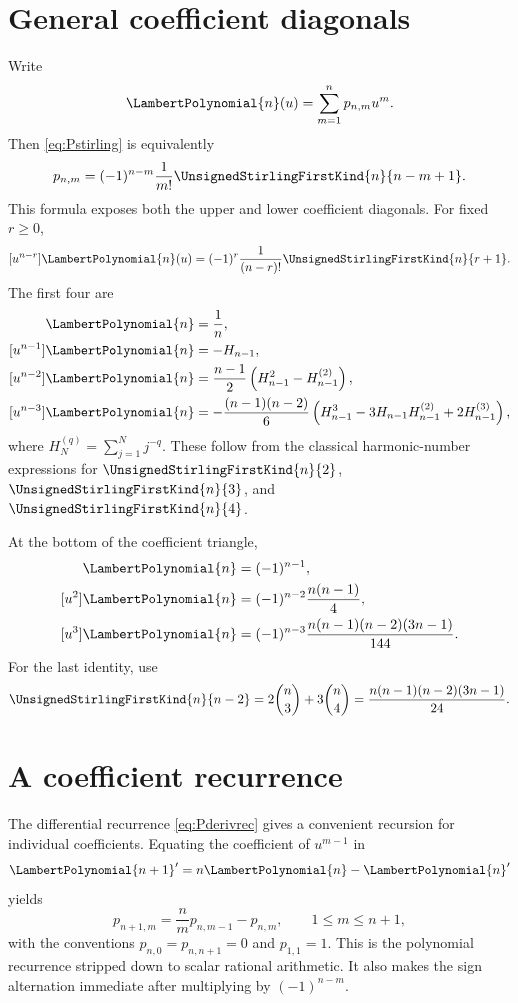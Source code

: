 \documentclass[11pt,oneside,openany]{book}
\begin{document}
\section{General coefficient diagonals}
Write
\[
 \LambertPolynomial{n}(u)=\sum_{m=1}^np_{n,m}u^m.
\]
Then \cref{eq:Pstirling} is equivalently
\begin{equation}\label{eq:pnmappendix}
 p_{n,m}=(-1)^{n-m}\frac{1}{m!}
 \UnsignedStirlingFirstKind{n}{n-m+1}.
\end{equation}
This formula exposes both the upper and lower coefficient diagonals.
For fixed \(r\geq0\),
\begin{equation}\label{eq:upperdiagonal}
 [u^{n-r}]\LambertPolynomial{n}(u)
 =(-1)^r\frac{1}{(n-r)!}\UnsignedStirlingFirstKind{n}{r+1}.
\end{equation}
The first four are
\begin{align}
 [u^n]\LambertPolynomial{n}&=\frac1n,
 \label{eq:diagtop0}\\
 [u^{n-1}]\LambertPolynomial{n}&=-H_{n-1},
 \label{eq:diagtop1}\\
 [u^{n-2}]\LambertPolynomial{n}
 &=\frac{n-1}{2}\left(H_{n-1}^2-H_{n-1}^{(2)}\right),
 \label{eq:diagtop2}\\
 [u^{n-3}]\LambertPolynomial{n}
 &=-\frac{(n-1)(n-2)}{6}
 \left(H_{n-1}^3-3H_{n-1}H_{n-1}^{(2)}
       +2H_{n-1}^{(3)}\right),
 \label{eq:diagtop3}
\end{align}
where
\(H_N^{(q)}=\sum_{j=1}^Nj^{-q}\).
These follow from the classical harmonic-number expressions for
\(\UnsignedStirlingFirstKind{n}{2}\), \(\UnsignedStirlingFirstKind{n}{3}\), and
\(\UnsignedStirlingFirstKind{n}{4}\).

At the bottom of the coefficient triangle,
\begin{align}
 [u]\LambertPolynomial{n}&=(-1)^{n-1},
 \label{eq:diagbottom1}\\
 [u^2]\LambertPolynomial{n}&=(-1)^{n-2}\frac{n(n-1)}4,
 \label{eq:diagbottom2}\\
 [u^3]\LambertPolynomial{n}&=(-1)^{n-3}
 \frac{n(n-1)(n-2)(3n-1)}{144}.
 \label{eq:diagbottom3}
\end{align}
For the last identity, use
\[
 \UnsignedStirlingFirstKind{n}{n-2}
 =2\binom n3+3\binom n4
 =\frac{n(n-1)(n-2)(3n-1)}{24}.
\]

\section{A coefficient recurrence}
The differential recurrence \cref{eq:Pderivrec} gives a convenient recursion
for individual coefficients.  Equating the coefficient of \(u^{m-1}\) in
\[
 {\LambertPolynomial{n+1}}'=n\LambertPolynomial{n}-{\LambertPolynomial{n}}'
\]
yields
\begin{equation}\label{eq:pnmrecurrence}
 p_{n+1,m}
 =\frac{n}{m}p_{n,m-1}-p_{n,m},
 \qquad 1\leq m\leq n+1,
\end{equation}
with the conventions \(p_{n,0}=p_{n,n+1}=0\) and \(p_{1,1}=1\).
This is the polynomial recurrence stripped down to scalar rational arithmetic.
It also makes the sign alternation immediate after multiplying by
\((-1)^{n-m}\).
\end{document}
